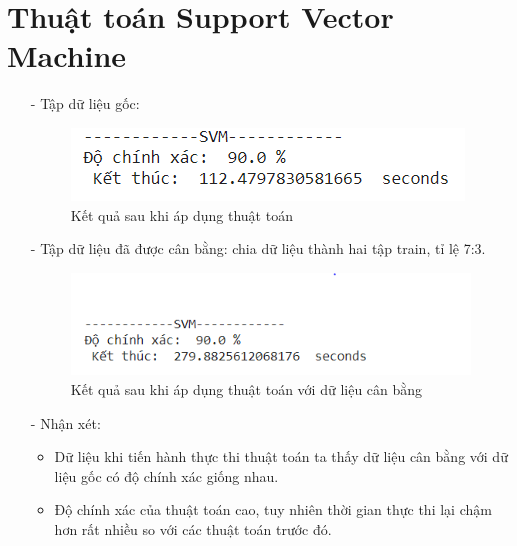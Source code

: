 \documentclass{report}
\begin{document}
\section{Thuật toán Support Vector Machine}
     \fontsize{13}{14}\selectfont
     \begin{enumerate}
    \item [- ]	Tập dữ liệu gốc:
         \begin{center}
        \begin{figure}[htp]
    	\begin{center}
    		\includegraphics[scale =1]{images/svm_o.PNG}
    	\end{center}
    		\caption{Kết quả sau khi áp dụng thuật toán}
    \end{figure}
        \end{center} 
    \item [- ]	Tập dữ liệu đã được cân bằng: chia dữ liệu thành hai tập train, tỉ lệ 7:3.
         \begin{center}
        \begin{figure}[htp]
    	\begin{center}
    		\includegraphics[scale =1]{images/svm_smo.PNG}
    	\end{center}
    		\caption{Kết quả sau khi áp dụng thuật toán với dữ liệu cân bằng}
    \end{figure}
        \end{center}
\item [- ]	Nhận xét:
     \begin{itemize}
            \item Dữ liệu khi tiến hành thực thi thuật toán ta thấy dữ liệu cân bằng với dữ liệu gốc có độ chính xác giống nhau.
            \item Độ chính xác của thuật toán cao, tuy nhiên thời gian thực thi lại chậm hơn rất nhiều so với các thuật toán trước đó.
    \end{itemize}
    \end{enumerate}
    
\end{document}
